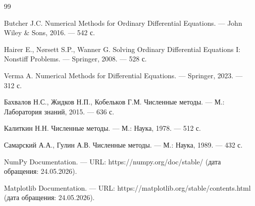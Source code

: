 \documentclass[a4paper,12pt]{article}
\begin{document}

\begin{thebibliography}{99}

 Butcher J.C. Numerical Methods for Ordinary Differential Equations. — John Wiley \& Sons, 2016. — 542 с.

 Hairer E., Nørsett S.P., Wanner G. Solving Ordinary Differential Equations I: Nonstiff Problems. — Springer, 2008. — 528 с.

 Verma A. Numerical Methods for Differential Equations. — Springer, 2023. — 312 с.

 Бахвалов Н.С., Жидков Н.П., Кобельков Г.М. Численные методы. — М.: Лаборатория знаний, 2015. — 636 с.

 Калиткин Н.Н. Численные методы. — М.: Наука, 1978. — 512 с.

 Самарский А.А., Гулин А.В. Численные методы. — М.: Наука, 1989. — 432 с.

 NumPy Documentation. — URL: https://numpy.org/doc/stable/ (дата обращения: 24.05.2026).

 Matplotlib Documentation. — URL: https://matplotlib.org/stable/contents.html (дата обращения: 24.05.2026).

\end{thebibliography}
\end{document}
